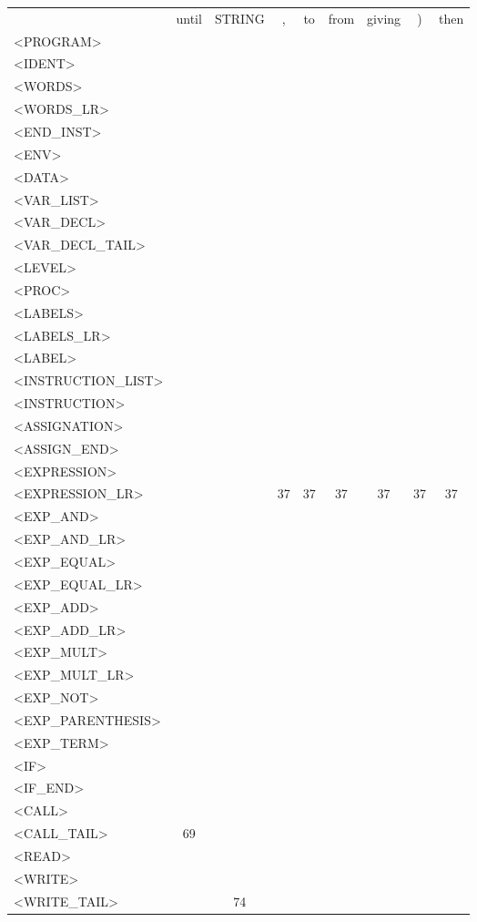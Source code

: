 \documentclass[a4paper,11pt]{article}
\begin{document}
\newpage
\begin{longtable}{l||cccccccc}
	& until & STRING & , & to & from & giving & ) & then \\
	<PROGRAM> & & & & & & & & \\
	<IDENT> & & & & & & & & \\
	<WORDS>  & & & & & & & & \\
	<WORDS\_LR>  & & & & & & & & \\
	<END\_INST> & & & & & & & & \\
	<ENV> & & & & & & & & \\
	<DATA>  & & & & & & & & \\
	<VAR\_LIST> & & & & & & & & \\
	<VAR\_DECL>  & & & & & & & & \\
	<VAR\_DECL\_TAIL> & & & & & & & & \\
	<LEVEL> & & & & & & & & \\
	<PROC> & & & & & & & & \\
	<LABELS> & & & & & & & & \\
	<LABELS\_LR>  & & & & & & & & \\
	<LABEL>  & & & & & & & & \\
	<INSTRUCTION\_LIST> & & & & & & & & \\
	<INSTRUCTION> & & & & & & & & \\
	<ASSIGNATION> & & & & & & & & \\
	<ASSIGN\_END> & & & & & & & & \\
	<EXPRESSION>  & & & & & & & & \\
	<EXPRESSION\_LR> & & & 37 & 37 & 37 & 37 & 37 & 37 \\
	<EXP\_AND>  & & & & & & & & \\
	<EXP\_AND\_LR> & & & & & & & & \\
	<EXP\_EQUAL>  & & & & & & & & \\
	<EXP\_EQUAL\_LR> & & & & & & & & \\
	<EXP\_ADD>  & & & & & & & & \\
	<EXP\_ADD\_LR> & & & & & & & & \\
	<EXP\_MULT>  & & & & & & & & \\
	<EXP\_MULT\_LR> & & & & & & & & \\
	<EXP\_NOT>  & & & & & & & & \\
	<EXP\_PARENTHESIS>  & & & & & & & & \\
	<EXP\_TERM>  & & & & & & & & \\
	<IF>  & & & & & & & & \\
	<IF\_END>  & & & & & & & & \\
	<CALL>  & & & & & & & & \\
	<CALL\_TAIL> & 69 & & & & & & & \\
	<READ>  & & & & & & & & \\
	<WRITE> & & & & & & & & \\
	<WRITE\_TAIL> & & 74 & & & & & & \\
\end{longtable}
\end{document}
